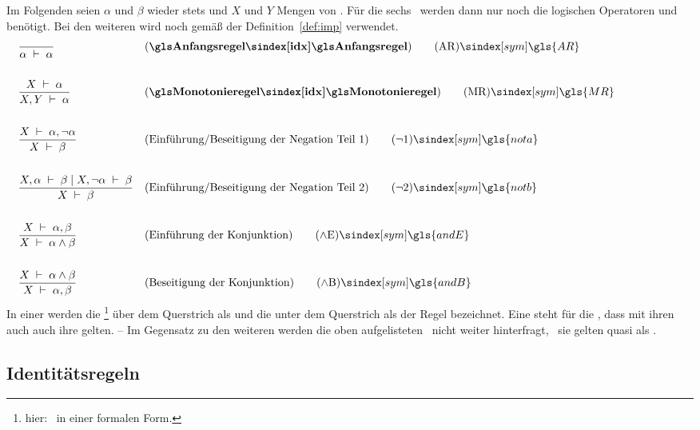 {Im Folgenden seien $\alpha$ und $\beta$ wieder stets  und $X$ und $Y$ Mengen von .
Für die sechs \Basisregeln\ werden dann nur noch die logischen Operatoren \chrqt{$\lnot$} und \chrqt{$\land$} benötigt.
Bei den weiteren  wird noch \chrqt{$\limp$} gemäß der Definition~\vref{def:imp} verwendet.
%
\begin{align}
	& \frac{}{\alpha\derive\alpha}
	& & (\text{\defn{\Anfangsregel}})
	\tag{\tagAR} \sym{\gls{AR}} \label{def:Anfangsregel}
	\\\\
	& \frac{X\derive\alpha}{X,Y\derive\alpha}
	& & (\text{\defn{\glsIdx{Monotonieregel}}})
	\tag{\tagMR} \sym{\gls{MR}} \label{def:Monotonieregel}
	\\\\
	& \frac{X\derive\alpha,\lnot\alpha}{X\derive\beta}
	& & (\text{Einführung/Beseitigung der Negation Teil 1})
	\tag{\tagnota} \sym{\gls{nota}} \label{def:nota}
	\\\\
	& \frac{X,\alpha\derive\beta \srand X,\lnot\alpha\derive\beta}{X\derive\beta}
	& & (\text{Einführung/Beseitigung der Negation Teil 2})
	\tag{\tagnotb} \sym{\gls{notb}} \label{def:notb}
	\\\\
	& \frac{X\derive\alpha,\beta}{X\derive\alpha\land\beta}
	& & (\text{Einführung der Konjunktion})
	\tag{\tagandE} \sym{\gls{andE}} \label{def:andE}
	\\\\
	& \frac{X\derive\alpha\land\beta}{X\derive\alpha,\beta}
	& & (\text{Beseitigung der Konjunktion})
	\tag{\tagandB} \sym{\gls{andB}} \label{def:andB}
	\formulatoleft
\end{align}
%
In einer  werden die %
\footnote{hier: \Aussagen\ in einer formalen Form.}
über dem Querstrich als  und die unter dem Querstrich als  der Regel bezeichnet.
Eine  steht für die \Aussage, dass mit ihren  auch auch ihre  gelten.
-- Im Gegensatz zu den weiteren  werden die oben aufgelisteten \Basisregeln\ nicht weiter hinterfragt, \textdh\ sie gelten quasi als \Axiome.

\subsection{Identitätsregeln}%
\label{sub:Identitätsregeln}

}
